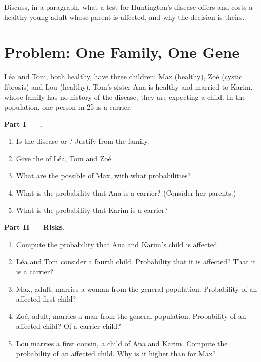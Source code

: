 \begin{exercise}[$\star\star\star$]\label{exo:g11:genes-and-disease:15}
Discuss, in a paragraph, what a test for Huntington's disease offers
and costs a healthy young adult whose parent is affected, and why the
decision is theirs.
\end{exercise}

\section{Problem: One Family, One Gene}

\begin{problem}
\label{pb:g11:genes-and-disease:1}
Léa and Tom, both healthy, have three children: Max (healthy), Zoé
(cystic fibrosis) and Lou (healthy). Tom's sister Ana is healthy and
married to Karim, whose family has no history of the disease; they are
expecting a child. In the population, one person in 25 is a carrier.

\medskip
\noindent\textbf{Part I --- .}
\begin{enumerate}
  \item Is the disease  or ? Justify from the family.
  \item Give the  of Léa, Tom and Zoé.
  \item What are the possible  of Max, with what
        probabilities?
  \item What is the probability that Ana is a carrier? (Consider her
        parents.)
  \item What is the probability that Karim is a carrier?
\end{enumerate}

\medskip
\noindent\textbf{Part II --- Risks.}
\begin{enumerate}[resume]
  \item Compute the probability that Ana and Karim's child is
        affected.
  \item Léa and Tom consider a fourth child. Probability that it is
        affected? That it is a carrier?
  \item Max, adult, marries a woman from the general population.
        Probability of an affected first child?
  \item Zoé, adult, marries a man from the general population.
        Probability of an affected child? Of a carrier child?
  \item Lou marries a first cousin, a child of Ana and Karim.
        Compute the probability of an affected child. Why is it higher
        than for Max?
\end{enumerate}


\end{problem}
